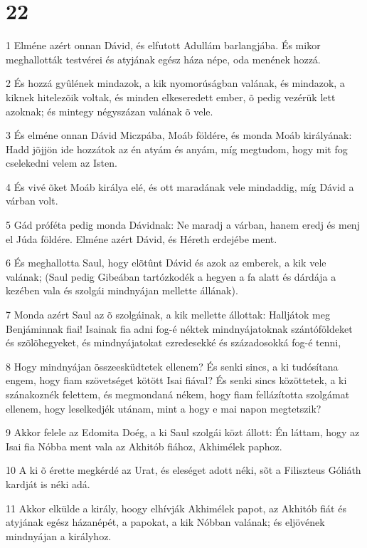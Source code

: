 \chapter{22}

\par 1 Elméne azért onnan Dávid, és elfutott Adullám barlangjába. És mikor meghallották testvérei és atyjának egész háza népe, oda menének hozzá.
\par 2 És hozzá gyûlének mindazok, a kik nyomorúságban valának, és mindazok, a kiknek hitelezõik voltak, és minden elkeseredett ember, õ pedig vezérük lett azoknak; és mintegy négyszázan valának õ vele.
\par 3 És elméne onnan Dávid Miczpába, Moáb földére, és monda Moáb királyának: Hadd jõjjön ide hozzátok az én atyám és anyám, míg megtudom, hogy mit fog cselekedni velem az Isten.
\par 4 És vivé õket Moáb királya elé, és ott maradának vele mindaddig, míg Dávid a várban volt.
\par 5 Gád próféta pedig monda Dávidnak: Ne maradj a várban, hanem eredj és menj el Júda földére. Elméne azért Dávid, és Héreth erdejébe ment.
\par 6 És meghallotta Saul, hogy elõtûnt Dávid és azok az emberek, a kik vele valának; (Saul pedig Gibeában tartózkodék a hegyen a fa alatt és dárdája a kezében vala és szolgái mindnyájan mellette állának).
\par 7 Monda azért Saul az õ szolgáinak, a kik mellette állottak: Halljátok meg Benjáminnak fiai! Isainak fia adni fog-é néktek mindnyájatoknak szántóföldeket és szõlõhegyeket, és mindnyájatokat ezredesekké és századosokká fog-é tenni,
\par 8 Hogy mindnyájan összeesküdtetek ellenem? És senki sincs, a ki tudósítana engem, hogy fiam szövetséget kötött Isai fiával? És senki sincs közöttetek, a ki szánakoznék felettem, és megmondaná nékem, hogy fiam fellázította szolgámat ellenem, hogy leselkedjék utánam, mint a hogy e mai napon megtetszik?
\par 9 Akkor felele az Edomita Doég, a ki Saul szolgái közt állott: Én láttam, hogy az Isai fia Nóbba ment vala az Akhitób fiához, Akhimélek paphoz.
\par 10 A ki õ érette megkérdé az Urat, és eleséget adott néki, sõt a Filiszteus Góliáth kardját is néki adá.
\par 11 Akkor elkülde a király, hoogy elhívják Akhimélek papot, az Akhitób fiát és atyjának egész házanépét, a papokat, a kik Nóbban valának; és eljövének mindnyájan a királyhoz.
